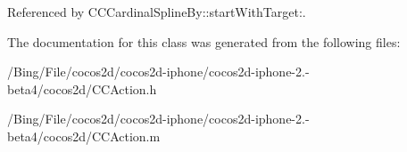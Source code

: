 Referenced by C\-C\-Cardinal\-Spline\-By\-::start\-With\-Target\-:.



The documentation for this class was generated from the following files\-:\begin{DoxyCompactItemize}
\item 
/\-Bing/\-File/cocos2d/cocos2d-\/iphone/cocos2d-\/iphone-\/2.-\/beta4/cocos2d/C\-C\-Action.\-h\item 
/\-Bing/\-File/cocos2d/cocos2d-\/iphone/cocos2d-\/iphone-\/2.-\/beta4/cocos2d/C\-C\-Action.\-m\end{DoxyCompactItemize}

